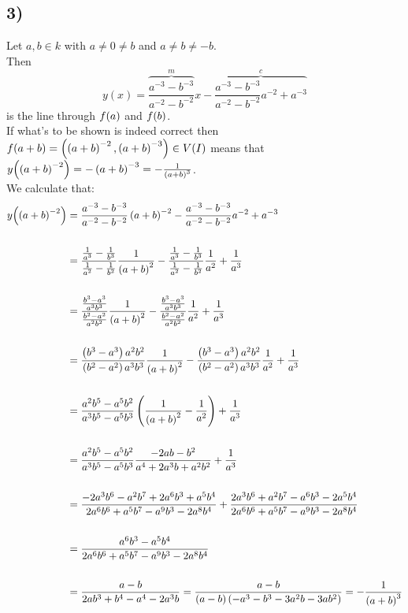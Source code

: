 \documentclass[a4paper]{scrartcl}
\begin{document}
\subsection*{3)}
Let $a,b\in k$ with $a\neq0\neq b$ and $a\neq b\neq -b$.\\
Then
\[y(x)=\overbrace{\frac{a^{-3}-b^{-3}}{a^{-2}-b^{-2}}}^mx-\overbrace{\frac{a^{-3}-b^{-3}}{a^{-2}-b^{-2}}a^{-2}+a^{-3}}^c\]
is the line through $f{\left( a \right)}$ and $f{\left( b \right)}$.\\
If what's to be shown is indeed correct then $f{\left( a+b \right)}=\left( \left( a+b \right)^{-2},\left( a+b \right)^{-3} \right)\in V{\left( I \right)}$ means that $y{\left( \left( a+b \right)^{-2} \right)}=-\left( a+b \right)^{-3}=-\frac{1}{\left( a+b \right)^3}$.\\
We calculate that:
\begin{align*}
    y{\left( \left( a+b \right)^{-2} \right)}&=\frac{a^{-3}-b^{-3}}{a^{-2}-b^{-2}}\left( a+b \right)^{-2}-\frac{a^{-3}-b^{-3}}{a^{-2}-b^{-2}}a^{-2}+a^{-3}\\
    &\\
    &=\frac{\frac{1}{a^3}-\frac{1}{b^3}}{\frac{1}{a^2}-\frac{1}{b^2}}\frac{1}{\left( a+b \right)^2}-\frac{\frac{1}{a^3}-\frac{1}{b^3}}{\frac{1}{a^2}-\frac{1}{b^2}}\frac{1}{a^2}+\frac{1}{a^3}\\
    &\\
    &=\frac{\frac{b^3-a^3}{a^3b^3}}{\frac{b^2-a^2}{a^2b^2}}\frac{1}{\left( a+b \right)^2}-\frac{\frac{b^3-a^3}{a^3b^3}}{\frac{b^2-a^2}{a^2b^2}}\frac{1}{a^2}+\frac{1}{a^3}\\
    &\\
    &=\frac{\left( b^3-a^3 \right)a^2b^2}{\left( b^2-a^2 \right)a^3b^3}\frac{1}{\left( a+b \right)^2}-\frac{\left( b^3-a^3 \right)a^2b^2}{\left( b^2-a^2 \right)a^3b^3}\frac{1}{a^2}+\frac{1}{a^3}\\
    &\\
    &=\frac{a^2b^5-a^5b^2}{a^3b^5-a^5b^3}\left( \frac{1}{\left( a+b \right)^2}-\frac{1}{a^2} \right)+\frac{1}{a^3}\\
    &\\
    &=\frac{a^2b^5-a^5b^2}{a^3b^5-a^5b^3}\frac{-2ab-b^2}{a^4+2a^3b+a^2b^2}+\frac{1}{a^3}\\
    &\\
    &=\frac{-2a^3b^6-a^2b^7+
    2a^6b^3+a^5b^4}{2a^6b^6+a^5b^7-a^9b^3-2a^8b^4}+\frac{2a^3b^6+a^2b^7-a^6b^3-2a^5b^4}{2a^6b^6+a^5b^7-a^9b^3-2a^8b^4}\\
    &\\
    &=\frac{a^6b^3-a^5b^4}{2a^6b^6+a^5b^7-a^9b^3-2a^8b^4}\\
    &\\
    &=\frac{a-b}{2ab^3+b^4-a^4-2a^3b}=\frac{a-b}{\left( a-b \right)\left( -a^3-b^3-3a^2b-3ab^2 \right)}=-\frac{1}{\left( a+b \right)^3}\\
\end{align*}
\end{document}
